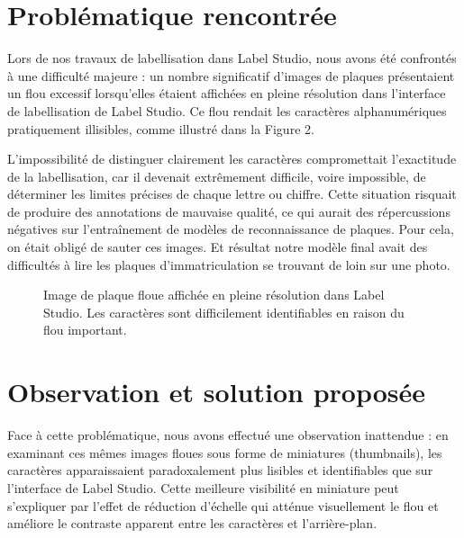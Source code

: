 \documentclass[twocolumn]{el-author}
\begin{document}
\section{Problématique rencontrée}

Lors de nos travaux de labellisation dans Label Studio, nous avons été confrontés à une difficulté majeure : un nombre significatif d'images de plaques présentaient un flou excessif lorsqu'elles étaient affichées en pleine résolution dans l'interface de labellisation de Label Studio. Ce flou rendait les caractères alphanumériques pratiquement illisibles, comme illustré dans la Figure 2.

L'impossibilité de distinguer clairement les caractères compromettait l'exactitude de la labellisation, car il devenait extrêmement difficile, voire impossible, de déterminer les limites précises de chaque lettre ou chiffre. Cette situation risquait de produire des annotations de mauvaise qualité, ce qui aurait des répercussions négatives sur l'entraînement de modèles de reconnaissance de plaques.
Pour cela, on était obligé de sauter ces images. Et résultat notre modèle final avait des difficultés à lire les plaques d'immatriculation se trouvant de loin sur une photo.

\begin{figure}[h]
\caption{Image de plaque floue affichée en pleine résolution dans Label Studio. Les caractères sont difficilement identifiables en raison du flou important.}
\end{figure}

\section{Observation et solution proposée}

Face à cette problématique, nous avons effectué une observation inattendue : en examinant ces mêmes images floues sous forme de miniatures (thumbnails), les caractères apparaissaient paradoxalement plus lisibles et identifiables que sur l'interface de Label Studio. Cette meilleure visibilité en miniature peut s'expliquer par l'effet de réduction d'échelle qui atténue visuellement le flou et améliore le contraste apparent entre les caractères et l'arrière-plan.
\end{document}
